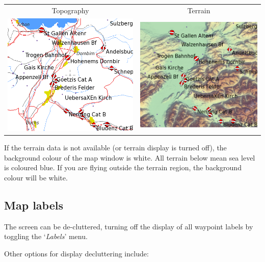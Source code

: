 \begin{center}
\begin{tabular}{c c}
Topography & Terrain \\
\includegraphics[angle=0,width=0.4\linewidth,keepaspectratio='true']{figures/cut-topo.png} &
\includegraphics[angle=0,width=0.4\linewidth,keepaspectratio='true']{figures/cut-terrain.png}
\end{tabular}
\end{center}

If the terrain data is not available (or terrain display is turned
off), the background colour of the map window is white.  All terrain
below mean sea level is coloured blue.  If you are flying outside the
terrain region, the background colour will be white.

\subsection*{Map labels}\label{sec:maplabels}

The screen can be de-cluttered, turning off the display of all waypoint labels by toggling the `\emph{Labels}' menu.

Other options for display decluttering include:


